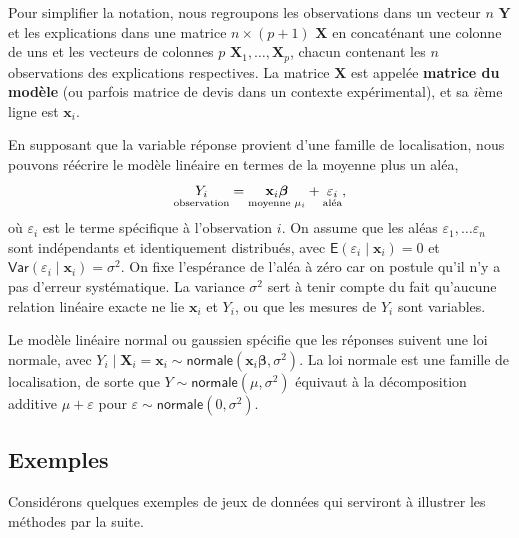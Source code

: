 \documentclass[
  11pt,
  letterpaper,
]{scrbook}
\theoremstyle{definition}
\theoremstyle{plain}
\theoremstyle{definition}
\theoremstyle{plain}
\theoremstyle{remark}
\begin{document}
Pour simplifier la notation, nous regroupons les observations dans un
vecteur \(n\) \(\boldsymbol{Y}\) et les explications dans une matrice
\(n \times (p+1)\) \(\mathbf{X}\) en concaténant une colonne de uns et
les vecteurs de colonnes \(p\)
\(\boldsymbol{X}_1, \ldots, \boldsymbol{X}_p\), chacun contenant les
\(n\) observations des explications respectives. La matrice
\(\mathbf{X}\) est appelée \textbf{matrice du modèle} (ou parfois
matrice de devis dans un contexte expérimental), et sa \(i\)ème ligne
est \(\mathbf{x}_i\).

En supposant que la variable réponse provient d'une famille de
localisation, nous pouvons réécrire le modèle linéaire en termes de la
moyenne plus un aléa, \begin{align*}
\underset{\text{observation}\vphantom{\mu_i}}{Y_i} = \underset{\text{moyenne } \mu_i}{\vphantom{Y_i}\mathbf{x}_i\boldsymbol{\beta}} + \underset{\text{aléa}\vphantom{\mu_i}}{\vphantom{Y_i}\varepsilon_i},
\end{align*} où \(\varepsilon_i\) est le terme spécifique à
l'observation \(i\). On assume que les aléas
\(\varepsilon_1, \ldots \varepsilon_n\) sont indépendants et
identiquement distribués, avec
\(\mathsf{E}(\varepsilon_i \mid \mathbf{x}_i) = 0\) et
\(\mathsf{Var}(\varepsilon_i \mid \mathbf{x}_i) = \sigma^2\). On fixe
l'espérance de l'aléa à zéro car on postule qu'il n'y a pas d'erreur
systématique. La variance \(\sigma^2\) sert à tenir compte du fait
qu'aucune relation linéaire exacte ne lie \(\mathbf{x}_i\) et \(Y_i\),
ou que les mesures de \(Y_i\) sont variables.

Le modèle linéaire normal ou gaussien spécifie que les réponses suivent
une loi normale, avec
\(Y_i \mid \boldsymbol{X}_i=\boldsymbol{x}_i \sim \mathsf{normale}(\mathbf{x}_i\boldsymbol{\beta}, \sigma^2)\).
La loi normale est une famille de localisation, de sorte que
\(Y \sim \mathsf{normale}(\mu, \sigma^2)\) équivaut à la décomposition
additive \(\mu + \varepsilon\) pour
\(\varepsilon \sim \mathsf{normale}(0, \sigma^2)\).

\subsection{Exemples}\label{exemples-1}

Considérons quelques exemples de jeux de données qui serviront à
illustrer les méthodes par la suite.
\end{document}
